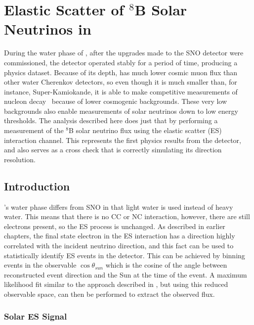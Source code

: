 \chapter{Elastic Scatter of \texorpdfstring{$^8$B}{Boron-8} Solar Neutrinos in \texorpdfstring{\snop}{SNO+}}
\label{ch:es}

During the water phase of {\snop}, after the upgrades made to the SNO detector were commissioned, the detector operated stably for a period of time, producing a physics dataset.
Because of its depth, {\snop} has much lower cosmic muon flux than other water Cherenkov detectors, so even though it is much smaller than, for instance, Super-Kamiokande, it is able to make competitive measurements of nucleon decay~\cite{nucleon_decay} because of lower cosmogenic backgrounds.
These very low backgrounds also enable measurements of solar neutrinos down to low energy thresholds.
The analysis described here does just that by performing a measurement of the $^8$B solar neutrino flux using the elastic scatter (ES) interaction channel.
This represents the first physics results from the {\snop} detector, and also serves as a cross check that {\snop} is correctly simulating its direction resolution.

\section{Introduction}
\label{sec:solar:intro}

{\snop}'s water phase differs from SNO in that light water is used instead of heavy water.
This means that there is no CC or NC interaction, however, there are still electrons present, so the ES process is unchanged.
As described in earlier chapters, the final state electron in the ES interaction has a direction highly correlated with the incident neutrino direction, and this fact can be used to statistically identify ES events in the detector.
This can be achieved by binning events in the observable $\cos{\theta_{sun}}$ which is the cosine of the angle between reconstructed event direction and the Sun at the time of the event.
A maximum likelihood fit similar to the approach described in , but using this reduced observable space, can then be performed to extract the observed flux.

\subsection{Solar ES Signal}
\label{sec:solar:inputs}

